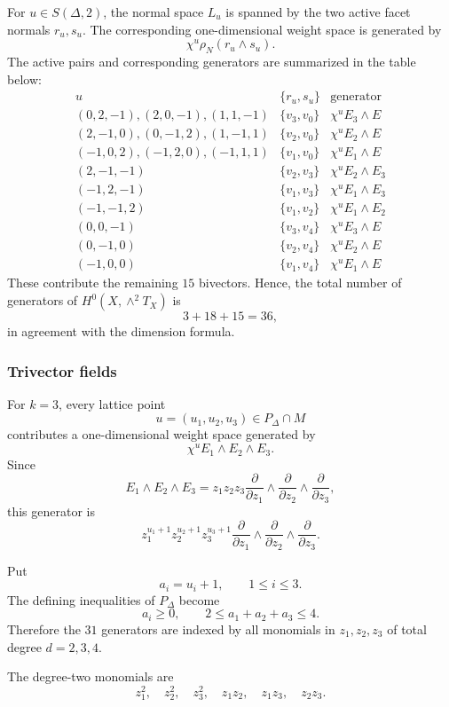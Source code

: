 \documentclass[colorlinks,11pt,reqno]{amsart}
\theoremstyle{definition}
\theoremstyle{remark}
\numberwithin{equation}{section}
\numberwithin{equation}{section}
\begin{document}
For \(u\in S(\Delta,2)\), the normal space \(L_u\) is spanned by the two active facet normals \(r_u,s_u\). The corresponding one-dimensional weight space is generated by
\[
\chi^u\rho_N(r_u\wedge s_u).
\]
The active pairs and corresponding generators are summarized in the table below:
\[
\begin{array}{c|c|c}
u & \{r_u,s_u\} & \text{generator }\\
\hline
(0,2,-1),(2,0,-1),(1,1,-1)&\{v_3,v_0\} & \chi^uE_3\wedge E\\
(2,-1,0),(0,-1,2),(1,-1,1)&\{v_2,v_0\} & \chi^uE_2\wedge E\\
(-1,0,2),(-1,2,0),(-1,1,1)&\{v_1,v_0\} & \chi^uE_1\wedge E\\
(2,-1,-1)&\{v_2,v_3\}   &\chi^uE_2\wedge E_3\\
(-1,2,-1)&\{v_1,v_3\}  &\chi^uE_1\wedge E_3 \\
(-1,-1,2)&\{v_1,v_2\}  &\chi^uE_1\wedge E_2\\
(0,0,-1)&\{v_3,v_4\}  &\chi^uE_3\wedge E \\
(0,-1,0)&\{v_2,v_4\}  &\chi^uE_2\wedge E\\
(-1,0,0)&\{v_1,v_4\}  &\chi^uE_1\wedge E
\end{array}
\]
These contribute the remaining \(15\) bivectors. Hence, the total number of generators of $H^0(X, \wedge^2 T_X)$ is
\[
3+18+15=36,
\]
in agreement with the dimension formula.

\subsubsection*{Trivector fields}

For \(k=3\), every lattice point
\[
u=(u_1,u_2,u_3)\in P_\Delta\cap M
\]
contributes a one-dimensional weight space generated by
\[
\chi^uE_1\wedge E_2\wedge E_3.
\]
Since
\[
E_1\wedge E_2\wedge E_3 = z_1z_2z_3
\frac{\partial}{\partial z_1}
\wedge
\frac{\partial}{\partial z_2}
\wedge
\frac{\partial}{\partial z_3},
\]
this generator is
\[
z_1^{u_1+1}z_2^{u_2+1}z_3^{u_3+1}
\frac{\partial}{\partial z_1}
\wedge
\frac{\partial}{\partial z_2}
\wedge
\frac{\partial}{\partial z_3}.
\]

Put
\[
a_i=u_i+1,\qquad1\leq i\leq3.
\]
The defining inequalities of \(P_\Delta\) become
\[
a_i\geq0,
\qquad
2\leq a_1+a_2+a_3\leq4.
\]
Therefore the \(31\) generators are indexed by all monomials in
\(z_1,z_2,z_3\) of total degree \(d=2,3,4\).

The degree-two monomials are
\[
z_1^2,\quad z_2^2,\quad z_3^2,\quad
z_1z_2,\quad z_1z_3,\quad z_2z_3.
\]
\end{document}
